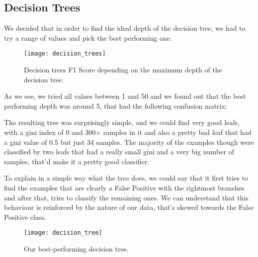 
\subsection{Decision Trees}%
\label{sub:decision-trees}
We decided that in order to find the ideal depth of the decision tree, we had to try a range of values and pick the best performing one.

\begin{figure}[H]
    \centering
    \texttt{[image: decision\_trees]}
    \caption{Decision trees F1 Score depending on the maximum depth of the decision tree.}%
    \label{fig:decision_trees_acc}
\end{figure}

As we see, we tried all values between 1 and 50 and we found out that the best performing depth was around 5, that had the following confusion matrix:

The resulting tree was surprisingly simple, and we could find very good leafs, with a gini index of 0 and 300+ samples in it and also a pretty bad leaf that had a gini value of 0.5 but just 34 samples. The majority of the examples though were classified by two leafs that had a really small gini and a very big number of samples, that'd make it a pretty good classifier.

To explain in a simple way what the tree does, we could say that it first tries to find the examples that are clearly a False Positive with the rightmost branches and after that, tries to classify the remaining ones. We can understand that this behaviour is reinforced by the nature of our data, that's skewed towards the False Positive class.

\begin{landscape}
\null
\vfill
\begin{figure}[H]
    \centering
    \texttt{[image: decision\_tree]}
    \caption{Our best-performing decision tree.}%
    \label{fig:decision_trees}
\end{figure}
\vfill
\null
\end{landscape}

